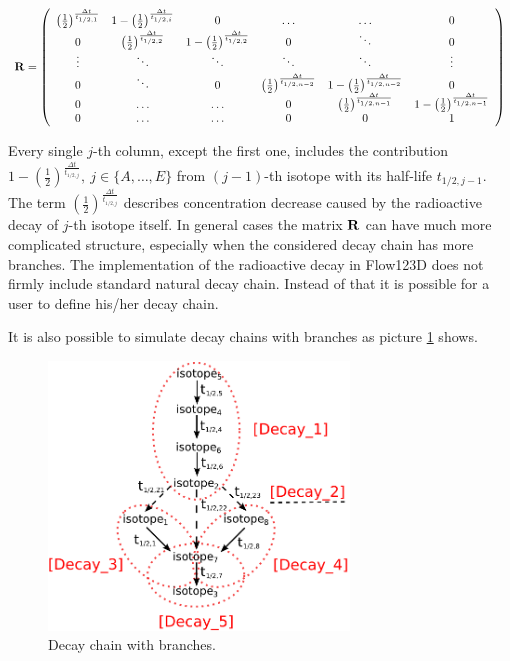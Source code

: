 \begin{tiny}\[
   \begin{array}{l}
    {\bf R} = \left(
    \begin{array}{cccccc}
     \left(\frac{1}{2}\right)^\frac{\Delta t}{t_{1/2,1}} & 1 - \left(\frac{1}{2}\right)^\frac{\Delta t}{t_{1/2,i}} & 0 & \hdots & \hdots & 0\\
     0 & \left(\frac{1}{2}\right)^\frac{\Delta t}{t_{1/2,2}} & 1 - \left(\frac{1}{2}\right)^\frac{\Delta t}{t_{1/2,2}} & 0 & \ddots & 0 \\
     \vdots & \ddots & \ddots & \ddots & \ddots & \vdots\\
     0 & \ddots & 0 & \left(\frac{1}{2}\right)^\frac{\Delta t}{t_{1/2,n-2}} & 1 - \left(\frac{1}{2}\right)^\frac{\Delta t}{t_{1/2,n-2}} & 0 \\
     0 & \hdots & \hdots & 0 & \left(\frac{1}{2}\right)^\frac{\Delta t}{t_{1/2,n-1}} & 1 - \left(\frac{1}{2}\right)^\frac{\Delta t}{t_{1/2,n-1}}\\
     0 & \hdots & \hdots & 0 & 0 & 1
    \end{array}\right)
   \end{array}
\]\end{tiny}

Every single $j$-th column, except the first one, includes the contribution $1 - \left(\frac{1}{2}\right)^\frac{\Delta t}{t_{1/2,j}},~j\in\{A,\ldots, E\}$ from $(j-1)$-th
isotope with its half-life $t_{1/2,j-1}$. The term $\left(\frac{1}{2}\right)^\frac{\Delta t}{t_{1/2,j}}$ describes concentration decrease caused by the radioactive decay of $j$-th isotope itself. In general cases the matrix ${\bf R}$ can have much more complicated structure, especially when the considered decay chain has more branches.
The implementation of the radioactive decay in Flow123D does not firmly include standard natural decay chain. Instead of that it is possible for a user to define his/her decay chain.

It is also possible to simulate decay chains with branches as picture \ref{pic:dec_branches} shows.

\begin{figure}[htb]
 \centering
 \includegraphics[width = 8cm]{./decay_chain}
 \caption{Decay chain with branches.}
 \label{pic:dec_branches}
\end{figure}


